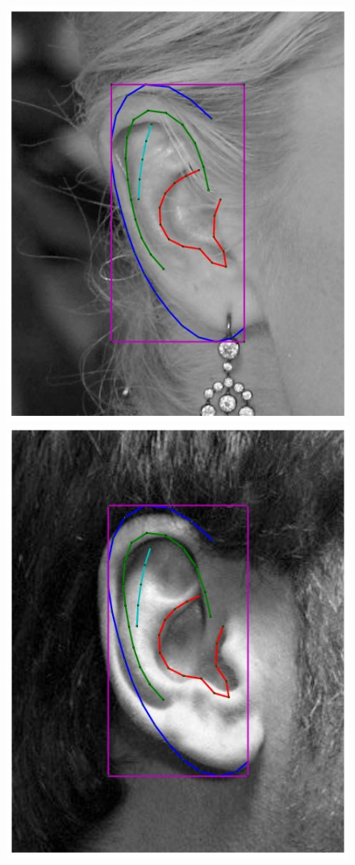 \begin{figure}[!t]
    \centering
    \newcommand{\flowh}{0.285\columnwidth}
    \includegraphics[height=\flowh]{resources/Ear_Deformable_Model/fittings/initial_0000}
    \includegraphics[height=\flowh]{resources/Ear_Deformable_Model/fittings/initial_0001}

\end{figure}

